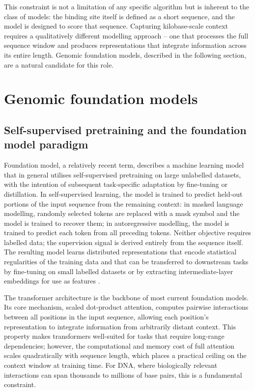 This constraint is not a limitation of any specific algorithm but is inherent to the class of models:
the binding site itself is defined as a short sequence, and the model is designed to score that sequence.
Capturing kilobase-scale context requires a qualitatively different modelling approach -- one that processes the full sequence window and produces representations that integrate information across its entire length.
Genomic foundation models, described in the following section, are a natural candidate for this role.

\section{Genomic foundation models}
\label{sec:foundation-models}

\subsection{Self-supervised pretraining and the foundation model paradigm}

Foundation model, a relatively recent term, describes a machine learning model that in general utilises self-supervised pretraining on large unlabelled datasets, with the intention of subsequent task-specific adaptation by fine-tuning or distillation.
In self-supervised learning, the model is trained to predict held-out portions of the input sequence from the remaining context: in masked language modelling, randomly selected tokens are replaced with a mask symbol and the model is trained to recover them; in autoregressive modelling, the model is trained to predict each token from all preceding tokens.
Neither objective requires labelled data;
the supervision signal is derived entirely from the sequence itself.
The resulting model learns distributed representations that encode statistical regularities of the training data and that can be transferred to downstream tasks by fine-tuning on small labelled datasets or by extracting intermediate-layer embeddings for use as features \cite{bommasaniOpportunitiesRisksFoundation2022}.

The transformer architecture \cite{vaswaniAttentionAllYou2017} is the backbone of most current foundation models.
Its core mechanism, scaled dot-product attention, computes pairwise interactions between all positions in the input sequence, allowing each position's representation to integrate information from arbitrarily distant context.
This property makes transformers well-suited for tasks that require long-range dependencies; however, the computational and memory cost of full attention scales quadratically with sequence length, which places a practical ceiling on the context window at training time.
For DNA, where biologically relevant interactions can span thousands to millions of base pairs, this is a fundamental constraint.

